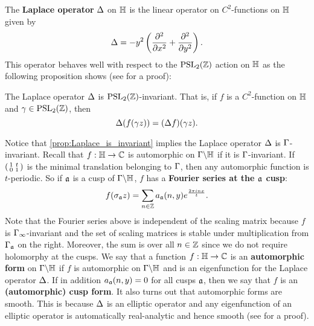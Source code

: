       The \textbf{Laplace operator} $\Delta$ on $\mathbb{H}$ is the linear operator on $C^{2}$-functions on $\mathbb{H}$ given by
      \[
        \Delta = -y^{2}\left(\frac{\partial^{2}}{\partial x^{2}}+\frac{\partial^{2}}{\partial y^{2}}\right).
      \]
      This operator behaves well with respect to the $\mathrm{PSL}_{2}(\mathbb{Z})$ action on $\mathbb{H}$ as the following proposition shows (see \cite{motohashi1997spectral} for a proof):

      \begin{proposition}\label{prop:Laplace_is_invariant}
        The Laplace operator $\Delta$ is $\mathrm{PSL}_{2}(\mathbb{Z})$-invariant. That is, if $f$ is a $C^{2}$-function on $\mathbb{H}$ and $\gamma \in \mathrm{PSL}_{2}(\mathbb{Z})$, then
        \[
          \Delta(f(\gamma z)) = (\Delta f)(\gamma z).
        \]
      \end{proposition}

      Notice that \cref{prop:Laplace_is_invariant} implies the Laplace operator $\Delta$ is $\Gamma$-invariant. Recall that $f:\mathbb{H} \to \mathbb{C}$ is automorphic on $\Gamma\backslash\mathbb{H}$ if it is $\Gamma$-invariant. If $\begin{psmallmatrix} 1 & t \\ 0 & 1 \end{psmallmatrix}$ is the minimal translation belonging to $\Gamma$, then any automorphic function is $t$-periodic. So if $\mathfrak{a}$ is a cusp of $\Gamma\backslash\mathbb{H}$, $f$ has a \textbf{Fourier series at the $\mathfrak{a}$ cusp}:
      \[
        f(\sigma_{\mathfrak{a}}z) = \sum_{n \in \mathbb{Z}}a_{\mathfrak{a}}(n,y)e^{\frac{2\pi inx}{t}}.
      \]
      Note that the Fourier series above is independent of the scaling matrix because $f$ is $\Gamma_{\infty}$-invariant and the set of scaling matrices is stable under multiplication from $\Gamma_{\mathfrak{a}}$ on the right. Moreover, the sum is over all $n \in \mathbb{Z}$ since we do not require holomorphy at the cusps. We say that a function $f:\mathbb{H} \to \mathbb{C}$ is an \textbf{automorphic form} on $\Gamma\backslash\mathbb{H}$ if $f$ is automorphic on $\Gamma\backslash\mathbb{H}$ and is an eigenfunction for the Laplace operator $\Delta$. If in addition $a_{\mathfrak{a}}(n,y) = 0$ for all cusps $\mathfrak{a}$, then we say that $f$ is an \textbf{(automorphic) cusp form}. It also turns out that automorphic forms are smooth. This is because $\Delta$ is an elliptic operator and any eigenfunction of an elliptic operator is automatically real-analytic and hence smooth (see \cite{evans2022partial} for a proof).

